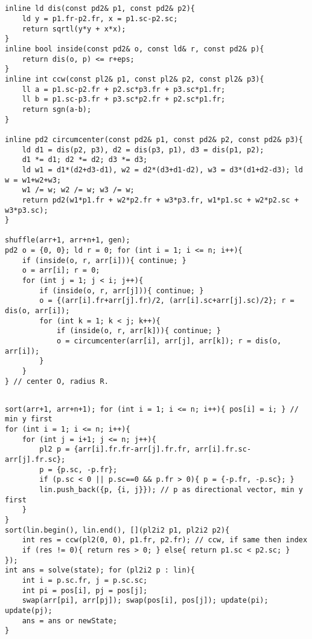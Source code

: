\documentclass[landscape, 8pt, a4paper, oneside, twocolumn]{extarticle}
\begin{document}
\subsection{}
\begin{verbatim}
inline ld dis(const pd2& p1, const pd2& p2){
    ld y = p1.fr-p2.fr, x = p1.sc-p2.sc;
    return sqrtl(y*y + x*x);
}
inline bool inside(const pd2& o, const ld& r, const pd2& p){
    return dis(o, p) <= r+eps;
}
inline int ccw(const pl2& p1, const pl2& p2, const pl2& p3){
    ll a = p1.sc-p2.fr + p2.sc*p3.fr + p3.sc*p1.fr;
    ll b = p1.sc-p3.fr + p3.sc*p2.fr + p2.sc*p1.fr;
    return sgn(a-b);
}

inline pd2 circumcenter(const pd2& p1, const pd2& p2, const pd2& p3){
    ld d1 = dis(p2, p3), d2 = dis(p3, p1), d3 = dis(p1, p2);
    d1 *= d1; d2 *= d2; d3 *= d3;
    ld w1 = d1*(d2+d3-d1), w2 = d2*(d3+d1-d2), w3 = d3*(d1+d2-d3); ld w = w1+w2+w3;
    w1 /= w; w2 /= w; w3 /= w;
    return pd2(w1*p1.fr + w2*p2.fr + w3*p3.fr, w1*p1.sc + w2*p2.sc + w3*p3.sc);
}

shuffle(arr+1, arr+n+1, gen);
pd2 o = {0, 0}; ld r = 0; for (int i = 1; i <= n; i++){
	if (inside(o, r, arr[i])){ continue; }
	o = arr[i]; r = 0;
	for (int j = 1; j < i; j++){
		if (inside(o, r, arr[j])){ continue; }
		o = {(arr[i].fr+arr[j].fr)/2, (arr[i].sc+arr[j].sc)/2}; r = dis(o, arr[i]);
		for (int k = 1; k < j; k++){
			if (inside(o, r, arr[k])){ continue; }
			o = circumcenter(arr[i], arr[j], arr[k]); r = dis(o, arr[i]);
		}
	}
} // center O, radius R.
\end{verbatim}
\subsection{}
\begin{verbatim}
sort(arr+1, arr+n+1); for (int i = 1; i <= n; i++){ pos[i] = i; } // min y first
for (int i = 1; i <= n; i++){
    for (int j = i+1; j <= n; j++){
        pl2 p = {arr[i].fr.fr-arr[j].fr.fr, arr[i].fr.sc-arr[j].fr.sc};
        p = {p.sc, -p.fr};
        if (p.sc < 0 || p.sc==0 && p.fr > 0){ p = {-p.fr, -p.sc}; }
        lin.push_back({p, {i, j}}); // p as directional vector, min y first
    }
}
sort(lin.begin(), lin.end(), [](pl2i2 p1, pl2i2 p2){
    int res = ccw(pl2(0, 0), p1.fr, p2.fr); // ccw, if same then index
    if (res != 0){ return res > 0; } else{ return p1.sc < p2.sc; }
});
int ans = solve(state); for (pl2i2 p : lin){
    int i = p.sc.fr, j = p.sc.sc;
    int pi = pos[i], pj = pos[j];
    swap(arr[pi], arr[pj]); swap(pos[i], pos[j]); update(pi); update(pj);
    ans = ans or newState;
}
\end{verbatim}
\end{document}
